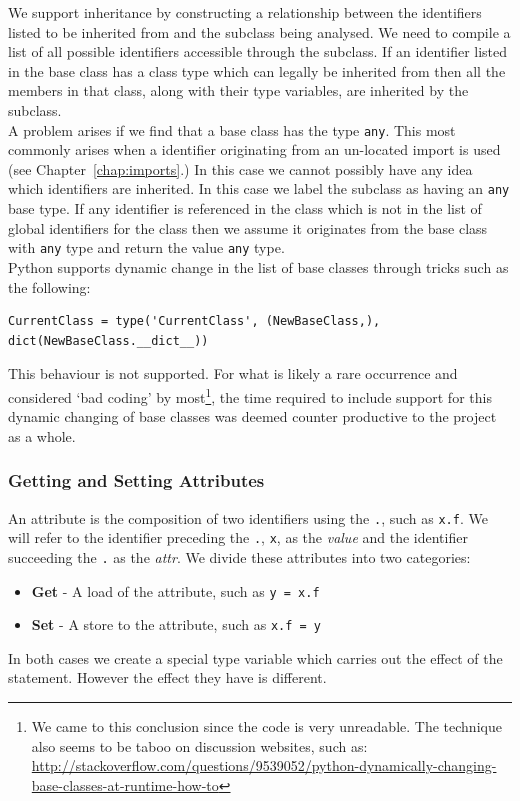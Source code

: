 \documentclass[12pt, titlepage]{article}
\begin{document}
\indent We support inheritance by constructing a relationship between the identifiers listed to be inherited from and the subclass being analysed. We need to compile a list of all possible identifiers accessible through the subclass. If an identifier listed in the base class has a class type which can legally be inherited from then all the members in that class, along with their type variables, are inherited by the subclass. \\
\indent A problem arises if we find that a base class has the type \texttt{any}. This most commonly arises when a identifier originating from an un-located import is used (see Chapter~\ref{chap:imports}.) In this case we cannot possibly have any idea which identifiers are inherited. In this case we label the subclass as having an \texttt{any} base type. If any identifier is referenced in the class which is not in the list of global identifiers for the class then we assume it originates from the base class with \texttt{any} type and return the value \texttt{any} type. \\
\indent Python supports dynamic change in the list of base classes through tricks such as the following:
\begin{lstlisting}[mathescape]
CurrentClass = type('CurrentClass', (NewBaseClass,), dict(NewBaseClass.__dict__))
\end{lstlisting}
This behaviour is not supported. For what is likely a rare occurrence and considered `bad coding' by most\footnote{We came to this conclusion since the code is very unreadable. The technique also seems to be taboo on discussion websites, such as: \url{http://stackoverflow.com/questions/9539052/python-dynamically-changing-base-classes-at-runtime-how-to}}, the time required to include support for this dynamic changing of base classes was deemed counter productive to the project as a whole.

\subsubsection{Getting and Setting Attributes}
An attribute is the composition of two identifiers using the \texttt{.}, such as \texttt{x.f}. We will refer to the identifier preceding the \texttt{.}, \texttt{x}, as the \textit{value} and the identifier succeeding the \texttt{.} as the \textit{attr}.  We divide these attributes into two categories:
\begin{itemize}
	\item \textbf{Get} - A load of the attribute, such as \texttt{y = x.f}
	\item \textbf{Set} - A store to the attribute, such as \texttt{x.f = y}
\end{itemize}
In both cases we create a special type variable which carries out the effect of the statement. However the effect they have is different.
\end{document}
